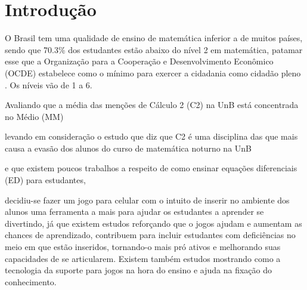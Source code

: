 \chapter[Introdução]{Introdução}

\begin{comment}
Tendo em vista que já é difícil para alunos aprenderem matemática, a dificuldade só aumenta quando fala-se de alunos com Transtorno do Déficit de Atenção com Hiperatividade (TDAH) inseridos no contexto de faculdade, onde a desatenção aumenta, já que professores não estão preparados e precisam renovar seus métodos para atrair atenção dos alunos para ensinar a matéria e ainda fazer disso algo divertido para fazer com que o foco seja maior ainda. Já que aprender brincando gera melhores resultados. Segundo (Russel A. Barkley, PhD. p. iv) quem possui TDAH têm mais dificuldades que pessoas normais em ambientes que exijam mais foco, objetividade e autocontrole. Também é dito que as características principais de TDAH podem trazer diversas dificuldades no contexto escolar (George J. DuPaul, PhD e Gary Stoner, PhD. p.4).

De acordo com (George J. DuPaul, PhD e Gary Stoner, PhD. p.4) o TDAH comparado a outros problemas como autismo e depressão é um transtorno de alta incidência e se mostra presente principalmente em meninos. Por isso o foco deste estudo também será em estudantes com TDAH.
\end{comment}

O Brasil tem uma qualidade de ensino de matemática inferior a de muitos países, sendo que 70.3\% dos estudantes estão abaixo do nível 2 em matemática, patamar esse que a Organização para a Cooperação e Desenvolvimento Econômico (OCDE) estabelece como o mínimo para exercer a cidadania como cidadão pleno \cite{inep2015nivelcidadania}. Os níveis vão de 1 a 6.  

Avaliando que a média das menções de Cálculo 2 (C2) na UnB está concentrada no Médio (MM)

levando em consideração o estudo \cite{evasaoC2} que diz que C2 é uma disciplina das que mais causa a evasão dos alunos do curso de matemática noturno na UnB

e que existem poucos trabalhos a respeito de como ensinar equações diferenciais (ED) para estudantes, 

decidiu-se fazer um jogo para celular com o intuito de inserir no ambiente dos alunos uma ferramenta a mais para ajudar os estudantes a aprender se divertindo, 
já que existem estudos reforçando que o jogos ajudam e aumentam as chances de aprendizado, contribuem para incluir estudantes com deficiências no meio em que estão inseridos, tornando-o mais pró ativos e melhorando suas capacidades de se articularem. 
Existem também estudos mostrando como a tecnologia da suporte para jogos na hora do ensino e ajuda na fixação do conhecimento. 

